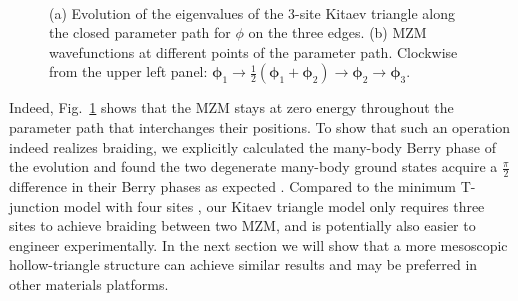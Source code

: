 \documentclass[aps,prb,twocolumn,showpacs,amsmath,amssymb,superscriptaddress]{revtex4-2}
\begin{document}
\begin{figure}[ht]
	\centering
  \hspace{-18pt}
  \\
	\caption{(a) Evolution of the eigenvalues of the 3-site Kitaev triangle along the closed parameter path for $\phi$ on the three edges. (b) MZM wavefunctions at different points of the parameter path. Clockwise from the upper left panel: $\bm \phi_1 \rightarrow \frac{1}{2}(\bm \phi_1 + \bm \phi_2)\rightarrow \bm \phi_2\rightarrow \bm \phi_3$.}
	\label{fig:3eig}
\end{figure}

Indeed, Fig.~\ref{fig:3eig} shows that the MZM stays at zero energy throughout the parameter path that interchanges their positions. To show that such an operation indeed realizes braiding, we explicitly calculated the many-body Berry phase of the evolution \cite{supp,aliceaNonAbelianStatisticsTopological2011,liManipulatingMajoranaZero2016} and found the two degenerate many-body ground states acquire a $\frac{\pi}{2}$ difference in their Berry phases as expected \cite{aliceaNonAbelianStatisticsTopological2011}. Compared to the minimum T-junction model with four sites \cite{aliceaNonAbelianStatisticsTopological2011}, our Kitaev triangle model only requires three sites to achieve braiding between two MZM, and is potentially also easier to engineer experimentally. In the next section we will show that a more mesoscopic hollow-triangle structure can achieve similar results and may be preferred in other materials platforms.
\end{document}
